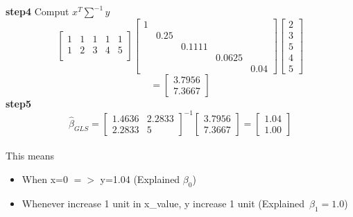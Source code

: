 \documentclass{article}
\begin{document}
\textbf{step4}
Comput $x^T\sum^{-1}y$\\
\[\begin{bmatrix}
    1 & 1 & 1 & 1 & 1 \\
    1 & 2 & 3 & 4 & 5 \\
\end{bmatrix}
\begin{bmatrix}
    1 & & & & \\
    & 0.25 & & & \\
    & & 0.1111 & & \\
    & & & 0.0625 & \\
    & & & & 0.04
\end{bmatrix}
\begin{bmatrix}
    2 \\
    3 \\
    5 \\
    4 \\
    5
\end{bmatrix}\]
\[=\begin{bmatrix}
    3.7956 \\
    7.3667
\end{bmatrix}\]
\textbf{step5}
\[\hat{\beta}_{GLS} = \begin{bmatrix}
    1.4636 & 2.2833 \\
    2.2833 & 5
\end{bmatrix}^{-1}
\begin{bmatrix}
    3.7956 \\
    7.3667
\end{bmatrix}
=\begin{bmatrix}
    1.04 \\
    1.00
\end{bmatrix}\]
\\
This means \\
\begin{itemize}
    \item When x=0 $=>$ y=1.04 (Explained $\beta_0$)
    \item Whenever increase 1 unit in x_value, y increase 1 unit (Explained\ $\beta_1 = 1.0$)
\end{itemize}
\end{document}
